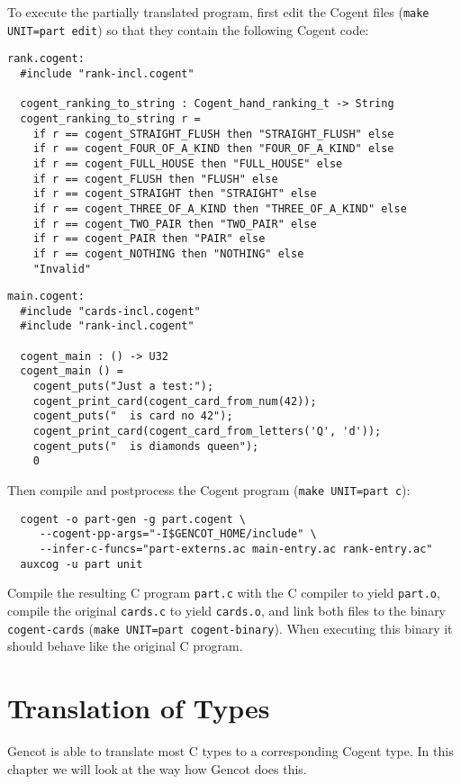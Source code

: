 \documentclass[a4paper]{report}
\newcommand{\code}[1]{\textnormal{\texttt{#1}}}
\begin{document}
To execute the partially translated program, first edit the Cogent files (\code{make UNIT=part edit}) so that they contain
the following Cogent code:
\begin{verbatim}
rank.cogent:
  #include "rank-incl.cogent"

  cogent_ranking_to_string : Cogent_hand_ranking_t -> String
  cogent_ranking_to_string r =
    if r == cogent_STRAIGHT_FLUSH then "STRAIGHT_FLUSH" else
    if r == cogent_FOUR_OF_A_KIND then "FOUR_OF_A_KIND" else
    if r == cogent_FULL_HOUSE then "FULL_HOUSE" else
    if r == cogent_FLUSH then "FLUSH" else
    if r == cogent_STRAIGHT then "STRAIGHT" else
    if r == cogent_THREE_OF_A_KIND then "THREE_OF_A_KIND" else
    if r == cogent_TWO_PAIR then "TWO_PAIR" else
    if r == cogent_PAIR then "PAIR" else
    if r == cogent_NOTHING then "NOTHING" else
    "Invalid"
\end{verbatim}

\begin{verbatim}
main.cogent:
  #include "cards-incl.cogent"
  #include "rank-incl.cogent"

  cogent_main : () -> U32
  cogent_main () =
    cogent_puts("Just a test:");
    cogent_print_card(cogent_card_from_num(42));
    cogent_puts("  is card no 42");
    cogent_print_card(cogent_card_from_letters('Q', 'd'));
    cogent_puts("  is diamonds queen");
    0
\end{verbatim}

Then compile and postprocess the Cogent program (\code{make UNIT=part c}):
\begin{verbatim}
  cogent -o part-gen -g part.cogent \
     --cogent-pp-args="-I$GENCOT_HOME/include" \
     --infer-c-funcs="part-externs.ac main-entry.ac rank-entry.ac"
  auxcog -u part unit
\end{verbatim}

Compile the resulting C program \code{part.c} with the C compiler to yield \code{part.o},
compile the original \code{cards.c} to yield \code{cards.o}, and link both files to the binary
\code{cogent-cards} (\code{make UNIT=part cogent-binary}). When executing this binary it should
behave like the original C program.

\chapter{Translation of Types}
\label{types}

Gencot is able to translate most C types to a corresponding Cogent type. In this chapter we will look at the way 
how Gencot does this.
\end{document}
